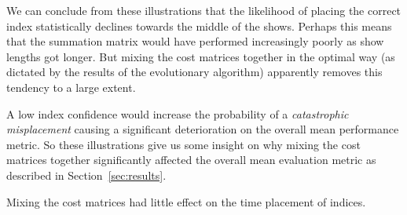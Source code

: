 \documentclass[twocolumn]{article}
\begin{document}
We can conclude from these illustrations that the likelihood of placing the correct index statistically declines towards the middle of the shows. Perhaps this means that the summation matrix would have performed increasingly poorly as show lengths got longer. But mixing the cost matrices together in the optimal way (as dictated by the results of the evolutionary algorithm) apparently removes this tendency to a large extent. 

A low index confidence would increase the probability of a \textit{catastrophic misplacement} causing a significant deterioration on the overall mean performance metric. So these illustrations give us some insight on why mixing the cost matrices together significantly affected the overall mean evaluation metric as described in Section~\ref{sec:results}.    

Mixing the cost matrices had little effect on the time placement of indices. 
\end{document}
